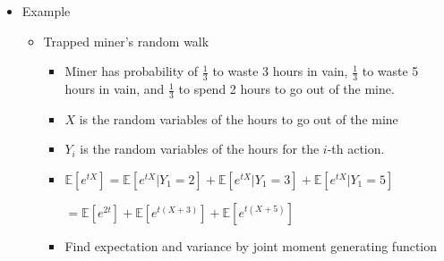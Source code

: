 \documentclass[a4paper]{article}
\begin{document}
\begin{itemize}
\begin{itemize}
        \end{itemize}
    \item Example
        \begin{itemize}
            \item Trapped miner's random walk
                \begin{itemize}
                    \item Miner has probability of $\frac{1}{3}$ to waste 3 hours in vain, $\frac{1}{3}$ to waste 5 hours in vain, and $\frac{1}{3}$ to spend 2 hours to go out of the mine.
                    \item $X$ is the random variables of the hours to go out of the mine
                    \item $Y_i$ is the random variables of the hours for the $i$-th action.
                    \item $\mathbb{E}[e^{tX}] = \mathbb{E}[e^{tX}|Y_1 = 2] + \mathbb{E}[e^{tX}|Y_1 = 3] + \mathbb{E}[e^{tX}|Y_1 = 5]$

                        $= \mathbb{E}[e^{2t}] + \mathbb{E}[e^{t(X+3)}] + \mathbb{E}[e^{t(X+5)}]$
                    \item Find expectation and variance by joint moment generating function
                \end{itemize}
        \end{itemize}
\end{itemize}
\end{document}
